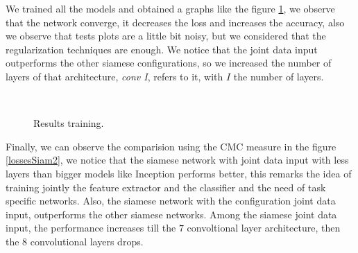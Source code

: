 \documentclass[12pt, a4paper, titlepage,twoside,openright]{article}
\begin{document}
We trained all the models and obtained a graphs like the figure \ref{lossesSiam}, we observe that the network converge, it decreases the loss and increases the accuracy, also we observe that tests plots are a little bit noisy, but we considered that the  regularization techniques are enough. We notice that the joint data input outperforms the other siamese configurations, so we increased the number of layers of that architecture, \textit{conv I}, refers to it, with $I$ the number of layers.

\begin{figure}[H]
		
\centering

\\

\caption{Results training.}
\label{lossesSiam}
\end{figure}



Finally, we can observe the comparision using the CMC measure in the figure \ref{lossesSiam2}, we notice that the siamese network with joint data input with less layers than bigger models like Inception performs better, this remarks the idea of training jointly the feature extractor and the classifier and the need of task specific networks. Also, the siamese network with the configuration joint data input, outperforms the other siamese networks. Among the siamese joint data input, the performance increases till the $7$ convoltional layer architecture, then the $8$ convolutional layers drops.
\end{document}
